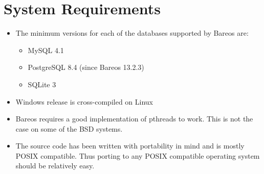 
\chapter{System Requirements}
\label{SysReqs}

\begin{itemize}
\item The minimum versions for each of the databases supported by Bareos
   are:
   \begin{itemize}
   \item MySQL 4.1
   \item PostgreSQL 8.4 (since Bareos 13.2.3)
   \item SQLite 3
   \end{itemize}
\item Windows release is cross-compiled on Linux
\item Bareos requires a good implementation of pthreads to work.  This
   is not the case on some of the BSD systems.
\item The source code has been written with portability in mind and is  mostly
   POSIX compatible. Thus porting to any POSIX compatible  operating system
   should be relatively easy.
\end{itemize}
